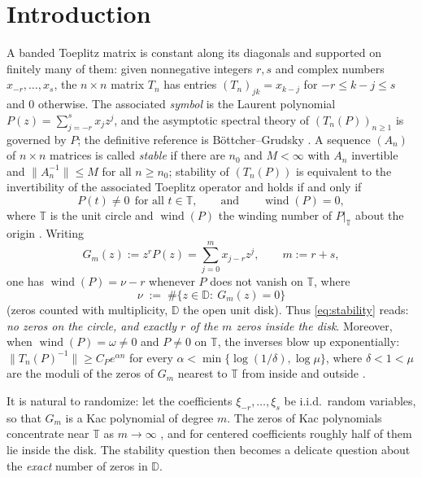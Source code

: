 \documentclass[11pt]{article}
\newcommand{\D}{\mathbb{D}}
\newcommand{\T}{\mathbb{T}}
\newcommand{\wind}{\operatorname{wind}}
\begin{document}
\section{Introduction}\label{sec:intro}

A banded Toeplitz matrix is constant along its diagonals and supported on
finitely many of them: given nonnegative integers $r,s$ and complex numbers
$x_{-r},\dots,x_s$, the $n\times n$ matrix $T_n$ has entries
$(T_n)_{jk}=x_{k-j}$ for $-r\le k-j\le s$ and $0$ otherwise.  The associated
\emph{symbol} is the Laurent polynomial $P(z)=\sum_{j=-r}^{s}x_jz^j$, and the
asymptotic spectral theory of $(T_n(P))_{n\ge1}$ is governed by $P$; the
definitive reference is B\"ottcher--Grudsky \cite{BG}.  A sequence $(A_n)$ of
$n\times n$ matrices is called \emph{stable} if there are $n_0$ and
$M<\infty$ with $A_n$ invertible and $\|A_n^{-1}\|\le M$ for all $n\ge n_0$;
stability of $(T_n(P))$ is equivalent to the invertibility of the associated
Toeplitz operator and holds if and only if
\begin{equation}\label{eq:stability}
P(t)\ne0\ \ \text{for all }t\in\T,
\qquad\text{and}\qquad
\wind(P)=0,
\end{equation}
where $\T$ is the unit circle and $\wind(P)$ the winding number of
$P|_\T$ about the origin \cite[Chapter~3]{BG}.  Writing
\[
G_m(z):=z^{r}P(z)=\sum_{j=0}^{m}x_{j-r}z^{j},
\qquad m:=r+s,
\]
one has $\wind(P)=\nu-r$ whenever $P$ does not vanish on $\T$, where
\[
\nu\;:=\;\#\{z\in\D:\ G_m(z)=0\}
\]
(zeros counted with multiplicity, $\D$ the open unit disk).  Thus
\eqref{eq:stability} reads: \emph{no zeros on the circle, and exactly $r$ of the
$m$ zeros inside the disk}.  Moreover, when $\wind(P)=\omega\ne0$ and $P\ne0$ on
$\T$, the inverses blow up exponentially:
$\|T_n(P)^{-1}\|\ge C_Pe^{\alpha n}$ for every
$\alpha<\min\{\log(1/\delta),\log\mu\}$, where $\delta<1<\mu$ are the moduli of
the zeros of $G_m$ nearest to $\T$ from inside and outside
\cite[Theorem~4.1]{BG}.

It is natural to randomize: let the coefficients $\xi_{-r},\dots,\xi_s$ be
i.i.d.\ random variables, so that $G_m$ is a Kac polynomial of degree $m$.  The
zeros of Kac polynomials concentrate near $\T$ as $m\to\infty$
\cite{IZ,HN}, and for centered coefficients roughly half of them lie inside the
disk.  The stability question then becomes a delicate question about the
\emph{exact} number of zeros in $\D$.
\end{document}
